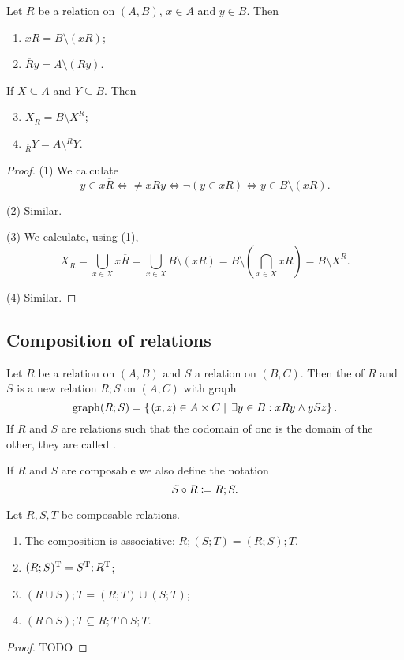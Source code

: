 \begin{lemma}
Let $R$ be a relation on $(A,B)$, $x\in A$ and $y\in B$. Then
\begin{enumerate}
\item $x\overline{R} = B\setminus (xR)$;
\item $\overline{R}y = A\setminus (Ry)$.
\end{enumerate}
If $X\subseteq A$ and $Y\subseteq B$. Then
\begin{enumerate} \setcounter{enumi}{2}
\item $X_{\overline{R}} = B\setminus X^R$;
\item $_{\overline{R}}Y = A\setminus {^RY}$.
\end{enumerate}
\end{lemma}
\begin{proof}
(1) We calculate
\[ y \in x\overline{R} \iff \neq xRy \iff \neg (y\in xR) \iff y\in B\setminus (xR). \]

(2) Similar.

(3) We calculate, using (1),
\[ X_{\overline{R}} = \bigcup_{x\in X}x\overline{R} = \bigcup_{x\in X}B\setminus (xR) = B\setminus \left(\bigcap_{x\in X}xR\right) = B\setminus X^R. \]

(4) Similar.
\end{proof}

\subsection{Composition of relations}
\begin{definition}
Let $R$ be a relation on $(A, B)$ and $S$ a relation on $(B, C)$. Then the  of $R$ and $S$ is a new relation $R;S$ on $(A, C)$ with graph
\[ \operatorname{graph}(R;S) = \left\{\left. (x,z)\in A\times C \;\right|\; \exists y\in B: xRy \land ySz \right\}. \]
If $R$ and $S$ are relations such that the codomain of one is the domain of the other, they are called .

If $R$ and $S$ are composable we also define the notation
\[ S\circ R \coloneqq R;S. \]
\end{definition}
\begin{lemma} \label{relationalComposition}
Let $R,S,T$ be composable relations.
\begin{enumerate}
\item The composition is associative: $R;(S;T) = (R;S);T$.
\item $(R;S)^{\mathrm{T}} = S^{\mathrm{T}} ; R^{\mathrm{T}}$;
\item $(R\cup S);T = (R;T) \cup (S;T)$;
\item $(R\cap S);T \subseteq R;T \cap S;T$.
\end{enumerate}
\end{lemma}
\begin{proof}
TODO
\end{proof}

